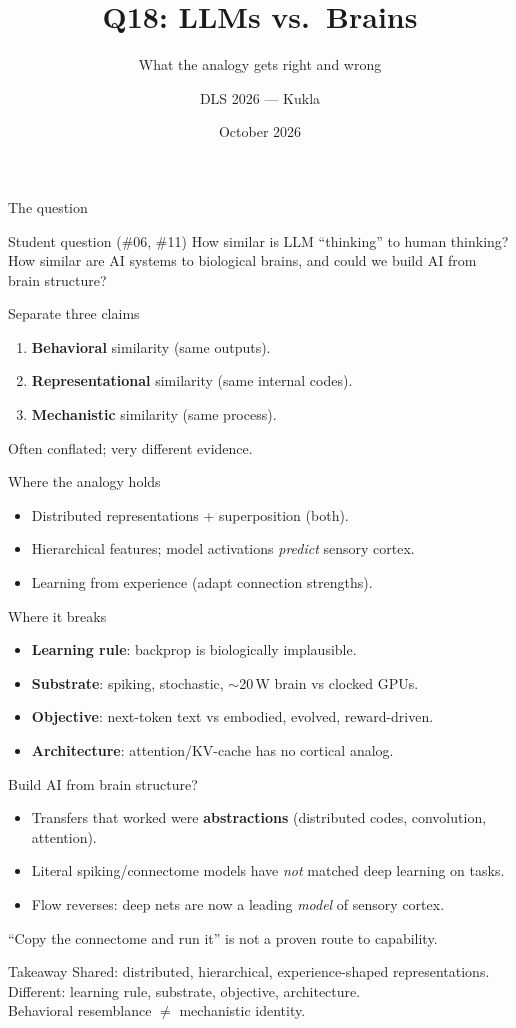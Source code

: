 \documentclass[aspectratio=169,10pt]{beamer}
\title{Q18: LLMs vs.\ Brains}
\subtitle{What the analogy gets right and wrong}
\author{DLS 2026 --- Kukla}
\date{October 2026}
\begin{document}
\maketitle

\begin{frame}{The question}
\begin{block}{Student question (\#06, \#11)}
How similar is LLM ``thinking'' to human thinking? How similar are AI systems to biological brains, and
could we build AI from brain structure?
\end{block}
\end{frame}
\begin{frame}{Separate three claims}
\begin{enumerate}
\item \textbf{Behavioral} similarity (same outputs).
\item \textbf{Representational} similarity (same internal codes).
\item \textbf{Mechanistic} similarity (same process).
\end{enumerate}
\alert{Often conflated; very different evidence.}
\end{frame}
\begin{frame}{Where the analogy holds}
\begin{itemize}
\item Distributed representations + superposition (both).
\item Hierarchical features; model activations \emph{predict} sensory cortex.
\item Learning from experience (adapt connection strengths).
\end{itemize}
\end{frame}
\begin{frame}{Where it breaks}
\begin{itemize}
\item \textbf{Learning rule}: backprop is biologically implausible.
\item \textbf{Substrate}: spiking, stochastic, $\sim$20\,W brain vs clocked GPUs.
\item \textbf{Objective}: next-token text vs embodied, evolved, reward-driven.
\item \textbf{Architecture}: attention/KV-cache has no cortical analog.
\end{itemize}
\end{frame}
\begin{frame}{Build AI from brain structure?}
\begin{itemize}
\item Transfers that worked were \textbf{abstractions} (distributed codes, convolution, attention).
\item Literal spiking/connectome models have \emph{not} matched deep learning on tasks.
\item Flow reverses: deep nets are now a leading \emph{model} of sensory cortex.
\end{itemize}
\alert{``Copy the connectome and run it'' is not a proven route to capability.}
\end{frame}
\begin{frame}{Takeaway}
Shared: distributed, hierarchical, experience-shaped representations.\\
Different: learning rule, substrate, objective, architecture.\\[1em]
\alert{Behavioral resemblance $\ne$ mechanistic identity.}
\end{frame}
\end{document}
